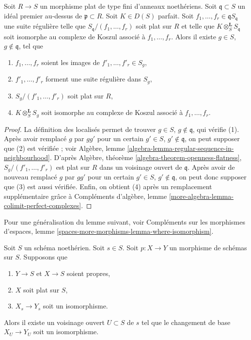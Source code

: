 \begin{lemma}
\label{lemma-limit-arguments}
Soit $R \to S$ un morphisme plat de type fini d'anneaux noethériens.
Soit $\mathfrak q \subset S$ un idéal premier au-dessus de
$\mathfrak p \subset R$. Soit $K \in D(S)$ parfait.
Soit $f_1, \ldots, f_r \in \mathfrak q S_\mathfrak q$
une suite régulière telle que $S_\mathfrak q/(f_1, \ldots, f_r)$
soit plat sur $R$ et telle que
$K \otimes_S^\mathbf{L} S_\mathfrak q$ soit isomorphe au
complexe de Koszul associé à $f_1, \ldots, f_r$. Alors il existe
$g \in S$, $g \not \in \mathfrak q$, tel que
\begin{enumerate}
\item $f_1, \ldots, f_r$ soient les images de
$f'_1, \ldots, f'_r \in S_g$,
\item $f'_1, \ldots, f'_r$ forment une suite régulière dans $S_g$,
\item $S_g/(f'_1, \ldots, f'_r)$ soit plat sur $R$,
\item $K \otimes_S^\mathbf{L} S_g$ soit isomorphe au
complexe de Koszul associé à $f_1, \ldots, f_r$.
\end{enumerate}
\end{lemma}

\begin{proof}
La définition des localisés permet de trouver $g \in S$, $g \not \in \mathfrak q$,
qui vérifie (1). Après avoir remplacé $g$ par
$gg'$ pour un certain $g' \in S$, $g' \not \in \mathfrak q$,
on peut supposer que (2) est vérifiée ; voir
Algèbre, lemme \ref{algebra-lemma-regular-sequence-in-neighbourhood}.
D'après Algèbre, théorème \ref{algebra-theorem-openness-flatness},
$S_g/(f'_1, \ldots, f'_r)$ est plat sur $R$
dans un voisinage ouvert de $\mathfrak q$.
Après avoir de nouveau remplacé $g$ par $gg'$ pour un certain
$g' \in S$, $g' \not \in \mathfrak q$, on peut donc supposer que (3) est aussi vérifiée.
Enfin, on obtient (4) après un remplacement supplémentaire grâce à
Compléments d'algèbre, lemme \ref{more-algebra-lemma-colimit-perfect-complexes}.
\end{proof}

\noindent
Pour une généralisation du lemme suivant, voir
Compléments sur les morphismes d'espaces, lemme
\ref{spaces-more-morphisms-lemma-where-isomorphism}.

\begin{lemma}
\label{lemma-isomorphism-in-neighbourhood}
Soit $S$ un schéma noethérien. Soit $s \in S$.
Soit $p : X \to Y$ un morphisme de schémas sur $S$.
Supposons que
\begin{enumerate}
\item $Y \to S$ et $X \to S$ soient propres,
\item $X$ soit plat sur $S$,
\item $X_s \to Y_s$ soit un isomorphisme.
\end{enumerate}
Alors il existe un voisinage ouvert $U \subset S$ de $s$
tel que le changement de base $X_U \to Y_U$ soit un isomorphisme.
\end{lemma}

